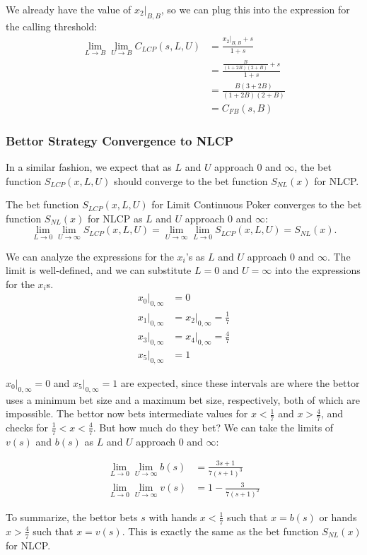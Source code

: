 \documentclass[../../main/main.tex]{subfiles}
\begin{document}
\begin{customproof}
We already have the value of $x_2|_{B,B}$, so we can plug this into the expression for the calling threshold:
\begin{align*}
    \lim_{L \to B} \lim_{U \to B} C_{LCP}(s, L, U) & = \frac{x_2|_{B,B}+s}{1+s} \\
    & = \frac{\frac{B}{(1+2B)(2+B)} + s}{1+s} \\
    & = \frac{B(3+2B)}{(1+2B)(2+B)} \\
    & = C_{FB}(s, B)
\end{align*}
\end{customproof}

\subsubsection{Bettor Strategy Convergence to NLCP}

In a similar fashion, we expect that as $L$ and $U$ approach $0$ and $\infty$, the bet function $S_{LCP}(x, L, U)$ should converge to the bet function $S_{NL}(x)$ for NLCP.

\begin{theorem}
    The bet function $S_{LCP}(x, L, U)$ for Limit Continuous Poker converges to the bet function $S_{NL}(x)$ for NLCP as $L$ and $U$ approach $0$ and $\infty$:
\[
\lim_{L \to 0} \lim_{U \to \infty} S_{LCP}(x, L, U) = \lim_{U \to \infty} \lim_{L \to 0} S_{LCP}(x, L, U) = S_{NL}(x).
\]
\end{theorem}
\begin{customproof}
We can analyze the expressions for the $x_i$'s as $L$ and $U$ approach $0$ and $\infty$. The limit is well-defined, and we can substitute $L=0$ and $U=\infty$ into the expressions for the $x_i$s.
\begin{align*}
    x_0|_{0,\infty} &= 0 \\
    x_1|_{0,\infty} &= x_2|_{0,\infty} = \frac{1}{7} \\
    x_3|_{0,\infty} &= x_4|_{0,\infty} = \frac{4}{7} \\
    x_5|_{0,\infty} &= 1
\end{align*}

$x_0|_{0,\infty} = 0$ and $x_5|_{0,\infty} = 1$ are expected, since these intervals are where the bettor uses a minimum bet size and a maximum bet size, respectively, both of which are impossible. The bettor now bets intermediate values for $x < \frac{1}{7}$ and $x > \frac{4}{7}$, and checks for $\frac{1}{7} < x < \frac{4}{7}$. But how much do they bet? We can take the limits of $v(s)$ and $b(s)$ as $L$ and $U$ approach $0$ and $\infty$:

\begin{align*}
    \lim_{L \to 0} \lim_{U \to \infty} b(s) &= \frac{3 s+1}{7 (s+1)^3}\\
    \lim_{L \to 0} \lim_{U \to \infty} v(s) &= 1 - \frac{3}{7 (s+1)^2}
\end{align*}

To summarize, the bettor bets $s$ with hands $x < \frac{1}{7}$ such that $x = b(s)$ or hands $x > \frac{4}{7}$ such that $x = v(s)$. This is exactly the same as the bet function $S_{NL}(x)$ for NLCP.

\end{customproof}
\end{document}
